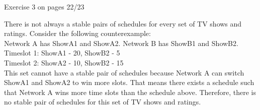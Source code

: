 \documentclass{cpsc413Solutions}
\begin{document}
\begin{problemlist}
\begin{problem}
\begin{answer}
\end{answer}
\end{problem}


\pbitem Exercise 3 on pages 22/23
\begin{problem}
\begin{answer}
\newline
There is not always a stable pairs of schedules for every set of TV shows and ratings. Consider the following counterexample:\\
Network A has ShowA1 and ShowA2. Network B has ShowB1 and ShowB2.\\
Timeslot 1: ShowA1 - 20, ShowB2 - 5\\
Timeslot 2: ShowA2 - 10, ShowB2 - 15\\
This set cannot have a stable pair of schedules because Network A can switch ShowA1 and ShowA2 to win more slots. That means there exists a schedule such that Network A wins more time slots than the schedule above. Therefore, there is no stable pair of schedules for this set of TV shows and ratings.

\newline

\end{answer}
\end{problem}

\end{problemlist}
\end{document}
